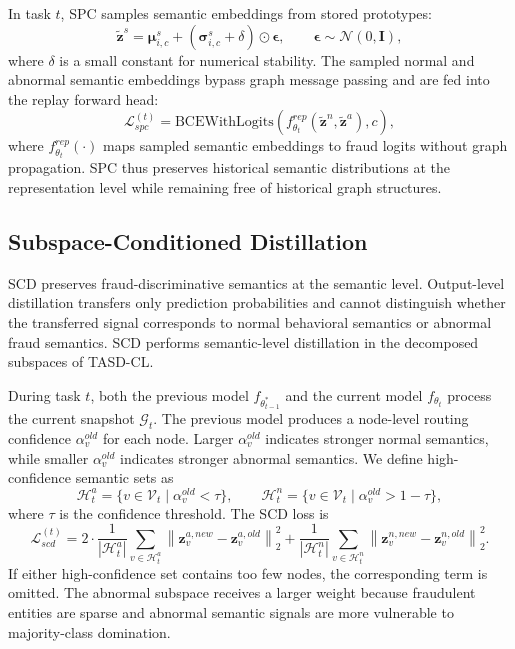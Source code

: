 In task $t$, SPC samples semantic embeddings from stored prototypes:
\begin{equation}
    \tilde{\mathbf{z}}^{s}
    =
    \boldsymbol{\mu}_{i,c}^{s}
    +
    (\boldsymbol{\sigma}_{i,c}^{s}+\delta)
    \odot
    \boldsymbol{\epsilon},
    \qquad
    \boldsymbol{\epsilon}\sim\mathcal{N}(0,\mathbf{I}),
\end{equation}
where $\delta$ is a small constant for numerical stability. The sampled normal and abnormal semantic embeddings bypass graph message passing and are fed into the replay forward head:
\begin{equation}
\label{eq:spc}
    \mathcal{L}_{spc}^{(t)}
    =
    \mathrm{BCEWithLogits}
    \left(
    f_{\theta_t}^{rep}
    (
    \tilde{\mathbf{z}}^{n},
    \tilde{\mathbf{z}}^{a}
    ),
    c
    \right),
\end{equation}
where $f_{\theta_t}^{rep}(\cdot)$ maps sampled semantic embeddings to fraud logits without graph propagation. SPC thus preserves historical semantic distributions at the representation level while remaining free of historical graph structures.

\subsection{Subspace-Conditioned Distillation}
\label{subsec:scd}

SCD preserves fraud-discriminative semantics at the semantic level. Output-level distillation transfers only prediction probabilities and cannot distinguish whether the transferred signal corresponds to normal behavioral semantics or abnormal fraud semantics. SCD performs semantic-level distillation in the decomposed subspaces of TASD-CL.

During task $t$, both the previous model $f_{\theta^*_{t-1}}$ and the current model $f_{\theta_t}$ process the current snapshot $\mathcal{G}_t$. The previous model produces a node-level routing confidence $\alpha^{old}_v$ for each node. Larger $\alpha^{old}_v$ indicates stronger normal semantics, while smaller $\alpha^{old}_v$ indicates stronger abnormal semantics. We define high-confidence semantic sets as
\begin{equation}
    \mathcal{H}^{a}_t
    =
    \{v\in\mathcal{V}_t \mid \alpha^{old}_v < \tau\},
    \qquad
    \mathcal{H}^{n}_t
    =
    \{v\in\mathcal{V}_t \mid \alpha^{old}_v > 1-\tau\},
\end{equation}
where $\tau$ is the confidence threshold. The SCD loss is
\begin{equation}
\label{eq:scd}
    \mathcal{L}_{scd}^{(t)}
    =
    2
    \cdot
    \frac{1}{|\mathcal{H}^{a}_t|}
    \sum_{v\in\mathcal{H}^{a}_t}
    \left\|
    \mathbf{z}^{a,new}_{v}
    -
    \mathbf{z}^{a,old}_{v}
    \right\|_2^2
    +
    \frac{1}{|\mathcal{H}^{n}_t|}
    \sum_{v\in\mathcal{H}^{n}_t}
    \left\|
    \mathbf{z}^{n,new}_{v}
    -
    \mathbf{z}^{n,old}_{v}
    \right\|_2^2 .
\end{equation}
If either high-confidence set contains too few nodes, the corresponding term is omitted. The abnormal subspace receives a larger weight because fraudulent entities are sparse and abnormal semantic signals are more vulnerable to majority-class domination.

